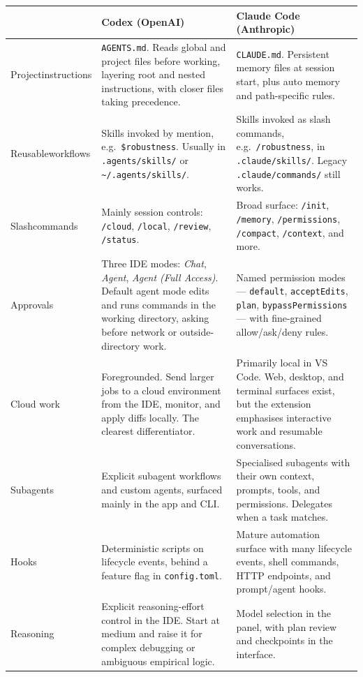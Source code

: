 \documentclass[11pt,a4paper]{article}
\newcommand{\code}[1]{\texttt{\small #1}}
\begin{document}
\begin{longtable}{@{}p{2.6cm}p{5.2cm}p{5.2cm}@{}}
\toprule
& \textbf{Codex (OpenAI)} & \textbf{Claude Code (Anthropic)} \\
\midrule
\endhead
Project\newline instructions &
\code{AGENTS.md}. Reads global and project files before working, layering root and
nested instructions, with closer files taking precedence. &
\code{CLAUDE.md}. Persistent memory files at session start, plus auto memory and
path-specific rules. \\
\addlinespace
Reusable\newline workflows &
Skills invoked by mention, e.g.\ \code{\$robustness}. Usually in
\code{.agents/skills/} or \code{\textasciitilde/.agents/skills/}. &
Skills invoked as slash commands, e.g.\ \code{/robustness}, in
\code{.claude/skills/}. Legacy \code{.claude/commands/} still works. \\
\addlinespace
Slash\newline commands &
Mainly session controls: \code{/cloud}, \code{/local}, \code{/review},
\code{/status}. &
Broad surface: \code{/init}, \code{/memory}, \code{/permissions},
\code{/compact}, \code{/context}, and more. \\
\addlinespace
Approvals &
Three IDE modes: \emph{Chat}, \emph{Agent}, \emph{Agent (Full Access)}. Default
agent mode edits and runs commands in the working directory, asking before
network or outside-directory work. &
Named permission modes --- \code{default}, \code{acceptEdits}, \code{plan},
\code{bypassPermissions} --- with fine-grained allow/ask/deny rules. \\
\addlinespace
Cloud work &
Foregrounded. Send larger jobs to a cloud environment from the IDE, monitor, and
apply diffs locally. The clearest differentiator. &
Primarily local in VS Code. Web, desktop, and terminal surfaces exist, but the
extension emphasises interactive work and resumable conversations. \\
\addlinespace
Subagents &
Explicit subagent workflows and custom agents, surfaced mainly in the app and
CLI. &
Specialised subagents with their own context, prompts, tools, and permissions.
Delegates when a task matches. \\
\addlinespace
Hooks &
Deterministic scripts on lifecycle events, behind a feature flag in
\code{config.toml}. &
Mature automation surface with many lifecycle events, shell commands, HTTP
endpoints, and prompt/agent hooks. \\
\addlinespace
Reasoning &
Explicit reasoning-effort control in the IDE. Start at medium and raise it for
complex debugging or ambiguous empirical logic. &
Model selection in the panel, with plan review and checkpoints in the interface. \\
\bottomrule
\end{longtable}
\end{document}
